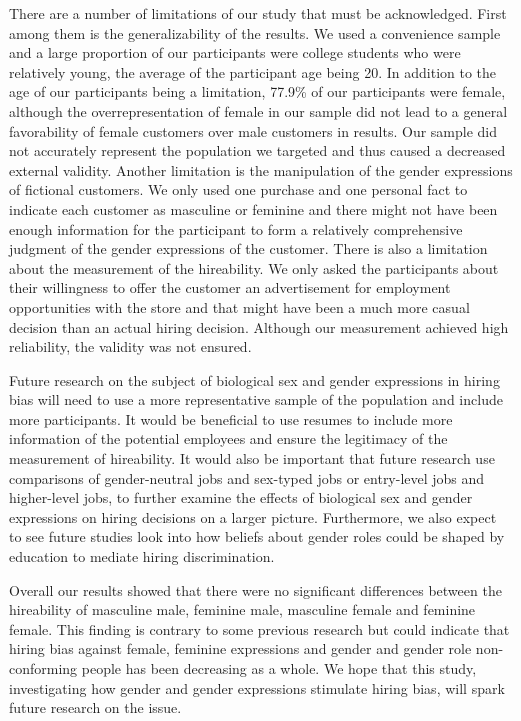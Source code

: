 \documentclass[english,man]{apa6}
\theoremstyle{definition}
\theoremstyle{definition}
\theoremstyle{remark}
\begin{document}
There are a number of limitations of our study that must be
acknowledged. First among them is the generalizability of the results.
We used a convenience sample and a large proportion of our participants
were college students who were relatively young, the average of the
participant age being 20. In addition to the age of our participants
being a limitation, 77.9\% of our participants were female, although the
overrepresentation of female in our sample did not lead to a general
favorability of female customers over male customers in results. Our
sample did not accurately represent the population we targeted and thus
caused a decreased external validity. Another limitation is the
manipulation of the gender expressions of fictional customers. We only
used one purchase and one personal fact to indicate each customer as
masculine or feminine and there might not have been enough information
for the participant to form a relatively comprehensive judgment of the
gender expressions of the customer. There is also a limitation about the
measurement of the hireability. We only asked the participants about
their willingness to offer the customer an advertisement for employment
opportunities with the store and that might have been a much more casual
decision than an actual hiring decision. Although our measurement
achieved high reliability, the validity was not ensured.

Future research on the subject of biological sex and gender expressions
in hiring bias will need to use a more representative sample of the
population and include more participants. It would be beneficial to use
resumes to include more information of the potential employees and
ensure the legitimacy of the measurement of hireability. It would also
be important that future research use comparisons of gender-neutral jobs
and sex-typed jobs or entry-level jobs and higher-level jobs, to further
examine the effects of biological sex and gender expressions on hiring
decisions on a larger picture. Furthermore, we also expect to see future
studies look into how beliefs about gender roles could be shaped by
education to mediate hiring discrimination.

Overall our results showed that there were no significant differences
between the hireability of masculine male, feminine male, masculine
female and feminine female. This finding is contrary to some previous
research but could indicate that hiring bias against female, feminine
expressions and gender and gender role non-conforming people has been
decreasing as a whole. We hope that this study, investigating how gender
and gender expressions stimulate hiring bias, will spark future research
on the issue.
\end{document}
